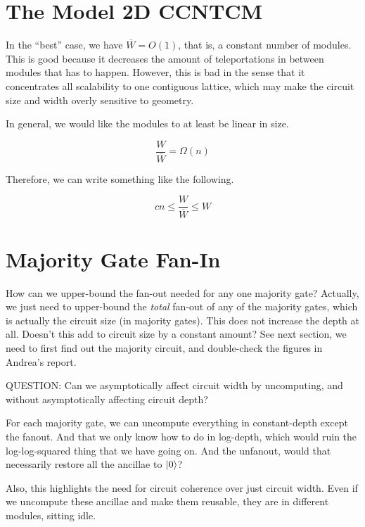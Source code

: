 \documentclass{article}
\begin{document}
\section{The Model \textsf{2D CCNTCM}}

In the ``best'' case, we have $\overline{W} = O(1)$, that is, a
constant number of modules. This is good because it decreases the
amount of teleportations in between modules that has to happen.
However, this is bad in the sense that it concentrates all
scalability to one contiguous lattice, which may make the circuit
size and width overly sensitive to geometry.

In general, we would like the modules to at least be linear in
size.

\begin{equation}
\frac{W}{\overline{W}} = \Omega(n)
\end{equation}

Therefore, we can write something like the following.

\begin{equation}
cn \le \frac{W}{\overline{W}} \le W
\end{equation}

\section{Majority Gate Fan-In}

How can we upper-bound the fan-out needed for any one majority gate?
Actually, we just need to upper-bound the \emph{total} fan-out of any
of the majority gates, which is actually the circuit size (in
majority gates). This does not increase the depth at all.
Doesn't this add to circuit size by a constant amount? See next section,
we need to first find out the majority circuit, and double-check the
figures in Andrea's report.

QUESTION: Can we asymptotically affect circuit width by uncomputing,
and without asymptotically affecting circuit depth?

For each majority gate, we can uncompute everything in constant-depth
except the fanout. And that we only know how to do in log-depth,
which would ruin the log-log-squared thing that we have going on. And
the unfanout, would that necessarily restore all the ancillae to
$\left\vert{0}\right\rangle$?

Also, this highlights the need for circuit coherence over just
circuit width. Even if we uncompute these ancillae and make them
reusable, they are in different modules, sitting idle.
\end{document}
